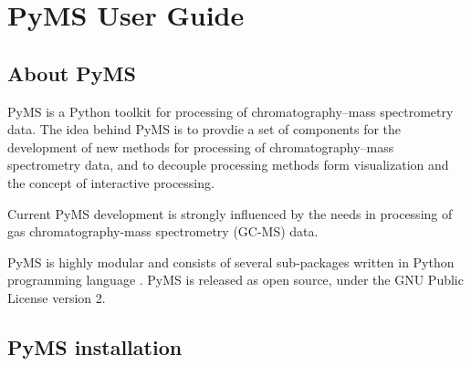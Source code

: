 

\chapter{PyMS User Guide}


\section{About PyMS}

PyMS is a Python toolkit for processing of chromatography--mass spectrometry
data. The idea behind PyMS is to provdie a set of components for the development
of new methods for processing of chromatography--mass spectrometry data, and to
decouple processing methods form visualization and the concept of interactive
processing.

Current PyMS development is strongly influenced by the needs in processing of gas
chromatography-mass spectrometry (GC-MS) data.

PyMS is highly modular and consists of several sub-packages written in Python
programming language \cite{python}. PyMS is released as open source, under
the GNU Public License version 2.



\section{PyMS installation}


